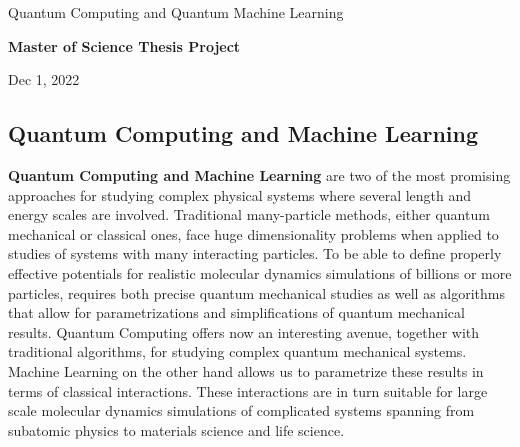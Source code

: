 \documentclass[%
oneside,                 %
final,                   %
10pt]{article}
\begin{document}

\newcommand{\exercisesection}[1]{\subsection*{#1}}






\thispagestyle{empty}

\begin{center}
{\LARGE\bf
\begin{spacing}{1.25}
Quantum Computing and Quantum Machine Learning
\end{spacing}
}
\end{center}


\begin{center}
{\bf Master of Science Thesis Project${}^{}$} \\ [0mm]
\end{center}

\begin{center}
\end{center}
    

\begin{center}
Dec 1, 2022
\end{center}

\vspace{1cm}


\subsection{Quantum Computing and Machine Learning}

\textbf{Quantum Computing and Machine Learning} are two of the most promising
approaches for studying complex physical systems where several length
and energy scales are involved.  Traditional many-particle methods,
either quantum mechanical or classical ones, face huge dimensionality
problems when applied to studies of systems with many interacting
particles. To be able to define properly effective potentials for
realistic molecular dynamics simulations of billions or more
particles, requires both precise quantum mechanical studies as well as
algorithms that allow for parametrizations and simplifications of
quantum mechanical results. Quantum Computing offers now an
interesting avenue, together with traditional algorithms, for studying
complex quantum mechanical systems. Machine Learning on the other hand
allows us to parametrize these results in terms of classical
interactions. These interactions are in turn suitable for large scale
molecular dynamics simulations of complicated systems spanning from
subatomic physics to materials science and life science.
\end{document}
